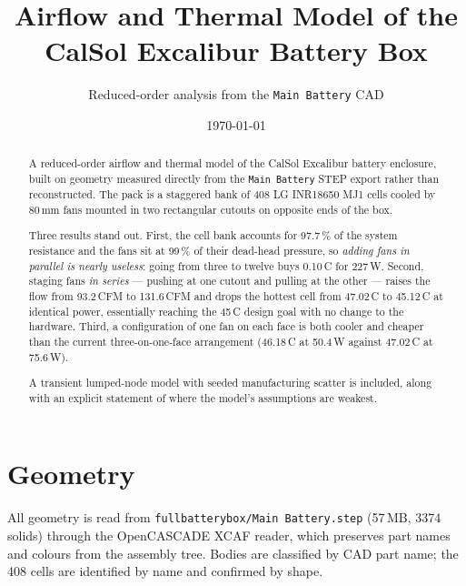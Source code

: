 \documentclass[11pt,a4paper]{article}
\title{\bfseries Airflow and Thermal Model of the CalSol Excalibur Battery Box}
\author{Reduced-order analysis from the \texttt{Main Battery} CAD}
\date{\today}
\newcommand{\qty}[2]{#1\,#2}
\begin{document}
\maketitle

\begin{abstract}
\noindent
A reduced-order airflow and thermal model of the CalSol Excalibur battery
enclosure, built on geometry measured directly from the \texttt{Main Battery}
STEP export rather than reconstructed. The pack is a staggered bank of
408 LG INR18650 MJ1 cells cooled by \qty{80}{mm} fans mounted in
two rectangular cutouts on opposite ends of the box.

Three results stand out. First, the cell bank accounts for \qty{97.7}{\%}
of the system resistance and the fans sit at \qty{99}{\%} of their
dead-head pressure, so \emph{adding fans in parallel is nearly useless}: going
from three to twelve buys \qty{0.10}{\textdegree C} for \qty{227}{W}. Second,
staging fans \emph{in series} --- pushing at one cutout and pulling at the other
--- raises the flow from \qty{93.2}{CFM} to \qty{131.6}{CFM} and drops the hottest
cell from \qty{47.02}{\textdegree C} to \qty{45.12}{\textdegree C} at identical power,
essentially reaching the \qty{45}{\textdegree C} design goal with no change to the
hardware. Third, a configuration of one fan on each face is both cooler and
cheaper than the current three-on-one-face arrangement
(\qty{46.18}{\textdegree C} at \qty{50.4}{W} against \qty{47.02}{\textdegree C} at
\qty{75.6}{W}).

A transient lumped-node model with seeded manufacturing scatter is included,
along with an explicit statement of where the model's assumptions are weakest.
\end{abstract}

\section{Geometry}

All geometry is read from \texttt{fullbatterybox/Main Battery.step}
(\qty{57}{MB}, 3374 solids) through the OpenCASCADE XCAF reader,
which preserves part names and colours from the assembly tree. Bodies are
classified by CAD part name; the 408 cells are identified by name and
confirmed by shape.
\end{document}
